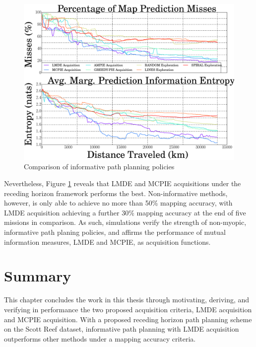 			\begin{figure}[!htbp]
			\centering
				\includegraphics[width = 0.8\linewidth]{Figures/serial_compare_methods.eps}
			\caption{Comparison of informative path planning policies}
			\label{Figure:SerialCompareMethods}
			\end{figure}
						
			Nevertheless, Figure \ref{Figure:SerialCompareMethods} reveals that LMDE and MCPIE acquisitions under the receding horizon framework performs the best. Non-informative methods, however, is only able to achieve no more than 50\% mapping accuracy, with LMDE acquisition achieving a further 30\% mapping accuracy at the end of five missions in comparison. As such, simulations verify the strength of non-myopic, informative path planing policies, and affirms the performance of mutual information measures, LMDE and MCPIE, as acquisition functions.
								
	\section{Summary}
	
		This chapter concludes the work in this thesis through motivating, deriving, and verifying in performance the two proposed acquisition criteria, LMDE acquisition and MCPIE acquisition. With a proposed receding horizon path planning scheme on the Scott Reef dataset, informative path planning with LMDE acquisition outperforms other methods under a mapping accuracy criteria.
		
		 
		
		
		